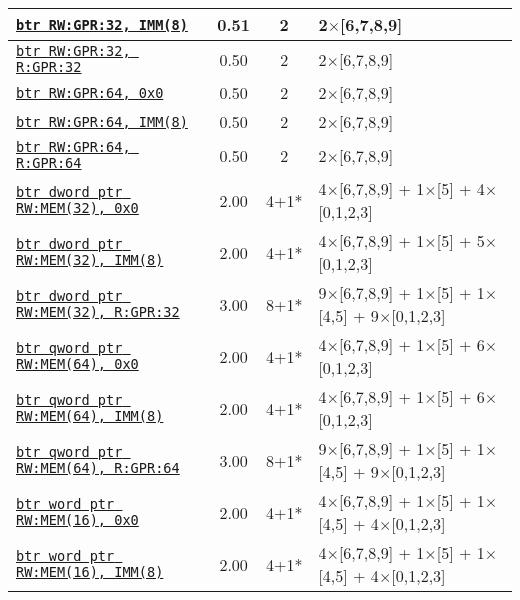 \documentclass[a4paper,english,fontsize=9]{scrartcl}
\begin{document}
\begin{longtable}{p{}ccL{.25\textwidth}}
  \midrule
  \texttt{\href{https://felixcloutier.com/x86/BTR.html}{btr RW:GPR:32, IMM(8)}} & 0.51 & 2 & 2\(\times\)[6,7,8,9] \\
  \midrule
  \texttt{\href{https://felixcloutier.com/x86/BTR.html}{btr RW:GPR:32, R:GPR:32}} & 0.50 & 2 & 2\(\times\)[6,7,8,9] \\
  \midrule
  \texttt{\href{https://felixcloutier.com/x86/BTR.html}{btr RW:GPR:64, 0x0}} & 0.50 & 2 & 2\(\times\)[6,7,8,9] \\
  \midrule
  \texttt{\href{https://felixcloutier.com/x86/BTR.html}{btr RW:GPR:64, IMM(8)}} & 0.50 & 2 & 2\(\times\)[6,7,8,9] \\
  \midrule
  \texttt{\href{https://felixcloutier.com/x86/BTR.html}{btr RW:GPR:64, R:GPR:64}} & 0.50 & 2 & 2\(\times\)[6,7,8,9] \\
  \midrule
  \texttt{\href{https://felixcloutier.com/x86/BTR.html}{btr dword ptr RW:MEM(32), 0x0}} & 2.00 & 4+1* & 4\(\times\)[6,7,8,9] + 1\(\times\)[5] + 4\(\times\)[0,1,2,3] \\
  \midrule
  \texttt{\href{https://felixcloutier.com/x86/BTR.html}{btr dword ptr RW:MEM(32), IMM(8)}} & 2.00 & 4+1* & 4\(\times\)[6,7,8,9] + 1\(\times\)[5] + 5\(\times\)[0,1,2,3] \\
  \midrule
  \texttt{\href{https://felixcloutier.com/x86/BTR.html}{btr dword ptr RW:MEM(32), R:GPR:32}} & 3.00 & 8+1* & 9\(\times\)[6,7,8,9] + 1\(\times\)[5] + 1\(\times\)[4,5] + 9\(\times\)[0,1,2,3] \\
  \midrule
  \texttt{\href{https://felixcloutier.com/x86/BTR.html}{btr qword ptr RW:MEM(64), 0x0}} & 2.00 & 4+1* & 4\(\times\)[6,7,8,9] + 1\(\times\)[5] + 6\(\times\)[0,1,2,3] \\
  \midrule
  \texttt{\href{https://felixcloutier.com/x86/BTR.html}{btr qword ptr RW:MEM(64), IMM(8)}} & 2.00 & 4+1* & 4\(\times\)[6,7,8,9] + 1\(\times\)[5] + 6\(\times\)[0,1,2,3] \\
  \midrule
  \texttt{\href{https://felixcloutier.com/x86/BTR.html}{btr qword ptr RW:MEM(64), R:GPR:64}} & 3.00 & 8+1* & 9\(\times\)[6,7,8,9] + 1\(\times\)[5] + 1\(\times\)[4,5] + 9\(\times\)[0,1,2,3] \\
  \midrule
  \texttt{\href{https://felixcloutier.com/x86/BTR.html}{btr word ptr RW:MEM(16), 0x0}} & 2.00 & 4+1* & 4\(\times\)[6,7,8,9] + 1\(\times\)[5] + 1\(\times\)[4,5] + 4\(\times\)[0,1,2,3] \\
  \midrule
  \texttt{\href{https://felixcloutier.com/x86/BTR.html}{btr word ptr RW:MEM(16), IMM(8)}} & 2.00 & 4+1* & 4\(\times\)[6,7,8,9] + 1\(\times\)[5] + 1\(\times\)[4,5] + 4\(\times\)[0,1,2,3] \\

\end{longtable}
\end{document}
